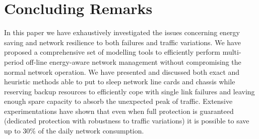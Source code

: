 \documentclass[final,5p,times,twocolumn]{elsarticle}
\begin{document}
\section{Concluding Remarks}\label{sec:conclusions}
In this paper we have exhaustively investigated the issues concerning energy saving and network resilience to both failures and traffic variations. We have proposed a comprehensive set of modelling tools to efficiently perform multi-period off-line energy-aware network management without compromising the normal network operation. We have presented and discussed both exact and heuristic methods able to put to sleep network line cards and chassis while reserving backup resources to efficiently cope with single link failures and leaving enough spare capacity to absorb the unexpected peak of traffic. Extensive experimentations have shown that even when full protection is guaranteed (dedicated protection with robustness to traffic variations) it is possible to save up to 30\% of the daily network consumption.
\end{document}
